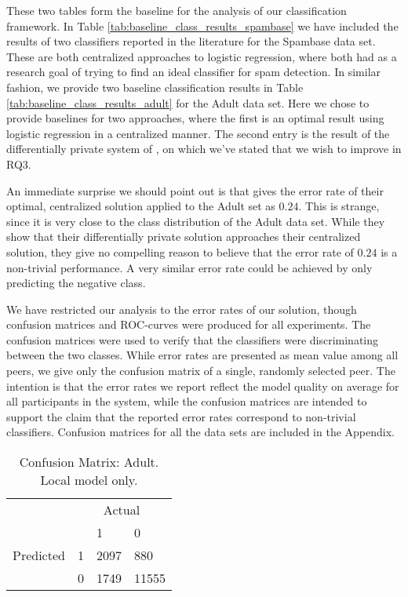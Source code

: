 These two tables form the baseline for the analysis of our classification framework. In Table \ref{tab:baseline_class_results_spambase} we have included the results of two classifiers reported in the literature \citep{sharma2013adaptive,kumar2012comparative} for the Spambase data set. These are both centralized approaches to logistic regression, where both had as a research goal of trying to find an ideal classifier for spam detection. In similar fashion, we provide two baseline classification results in Table \ref{tab:baseline_class_results_adult} for the Adult data set. Here we chose to provide baselines for two approaches, where the first \citep{caruana2006empirical} is an optimal result using logistic regression in a centralized manner. The second entry is the result of the differentially private system of \cite{pathak2010diffprivhomo}, on which we've stated that we wish to improve in RQ3.

An immediate surprise we should point out is that \cite{pathak2010diffprivhomo} gives the error rate of their optimal, centralized solution applied to the Adult set as $0.24$. This is strange, since it is very close to the class distribution of the Adult data set. While they show that their differentially private solution approaches their centralized solution, they give no compelling reason to believe that the error rate of $0.24$ is a non-trivial performance. A very similar error rate could be achieved by only predicting the negative class.

We have restricted our analysis to the error rates of our solution, though confusion matrices and ROC-curves were produced for all experiments. The confusion matrices were used to verify that the classifiers were discriminating between the two classes. While error rates are presented as mean value among all peers, we give only the confusion matrix of a single, randomly selected peer. The intention is that the error rates we report reflect the model quality on average for all participants in the system, while the confusion matrices are intended to support the claim that the reported error rates correspond to non-trivial classifiers. Confusion matrices for all the data sets are included in the Appendix.


\begin{table}[h]
	\centering
	\begin{tabular}{llll}
		& \multicolumn{3}{c}{Actual}                                                      \\
		\multicolumn{1}{c}{} &                        & 1                         & 0                          \\ \cline{3-4} 
		Predicted            & \multicolumn{1}{l|}{1} & \multicolumn{1}{l|}{2097} & \multicolumn{1}{l|}{880}   \\ \cline{3-4} 
		& \multicolumn{1}{l|}{0} & \multicolumn{1}{l|}{1749} & \multicolumn{1}{l|}{11555} \\ \cline{3-4} 
	\end{tabular}
	\caption{Confusion Matrix: Adult. Local model only.}
	\label{fig:confmat_adult_local}
\end{table}

